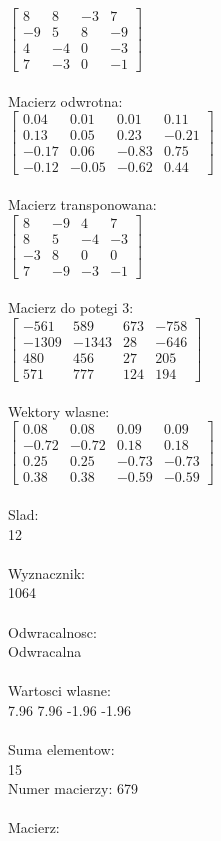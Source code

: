 \documentclass[a4paper,12pt]{article}
\begin{document}
$\begin{bmatrix} 8&8&-3&7\\-9&5&8&-9\\4&-4&0&-3\\7&-3&0&-1 \end{bmatrix}$
\\
\\
Macierz odwrotna:\\

$\begin{bmatrix} 0.04&0.01&0.01&0.11\\0.13&0.05&0.23&-0.21\\-0.17&0.06&-0.83&0.75\\-0.12&-0.05&-0.62&0.44 \end{bmatrix}$
\\
\\
Macierz transponowana:\\

$\begin{bmatrix} 8&-9&4&7\\8&5&-4&-3\\-3&8&0&0\\7&-9&-3&-1 \end{bmatrix}$
\\
\\
Macierz do potegi 3:\\

$\begin{bmatrix} -561&589&673&-758\\-1309&-1343&28&-646\\480&456&27&205\\571&777&124&194 \end{bmatrix}$
\\
\\
Wektory wlasne:\\

$\begin{bmatrix} 0.08&0.08&0.09&0.09\\-0.72&-0.72&0.18&0.18\\0.25&0.25&-0.73&-0.73\\0.38&0.38&-0.59&-0.59 \end{bmatrix}$
\\
\\
Slad:\\
12
\\
\\
Wyznacznik:\\
1064
\\
\\
Odwracalnosc:\\
Odwracalna
\\
\\
Wartosci wlasne:\\
7.96 7.96 -1.96 -1.96
\\
\\
Suma elementow:\\
15
\\
\newpage
Numer macierzy:
679
\\
\\
Macierz:\\
\end{document}
